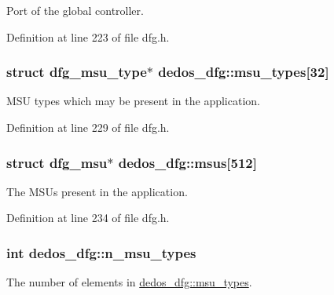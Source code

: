 Port of the global controller. 



Definition at line 223 of file dfg.\-h.

\hypertarget{structdedos__dfg_a6413c359339136a9acaf77df3b897305}{
\subsubsection[{msu\-\_\-types}]{\setlength{\rightskip}{0pt plus 5cm}struct {\bf dfg\-\_\-msu\-\_\-type}$\ast$ dedos\-\_\-dfg\-::msu\-\_\-types\mbox{[}32\mbox{]}}}\label{structdedos__dfg_a6413c359339136a9acaf77df3b897305}


M\-S\-U types which may be present in the application. 



Definition at line 229 of file dfg.\-h.

\hypertarget{structdedos__dfg_a5177dba1dea7f8f2fb383c5839c5f5f7}{
\subsubsection[{msus}]{\setlength{\rightskip}{0pt plus 5cm}struct {\bf dfg\-\_\-msu}$\ast$ dedos\-\_\-dfg\-::msus\mbox{[}512\mbox{]}}}\label{structdedos__dfg_a5177dba1dea7f8f2fb383c5839c5f5f7}


The M\-S\-Us present in the application. 



Definition at line 234 of file dfg.\-h.

\hypertarget{structdedos__dfg_ac78a52257324eec0ccf425530c84e91a}{
\subsubsection[{n\-\_\-msu\-\_\-types}]{\setlength{\rightskip}{0pt plus 5cm}int dedos\-\_\-dfg\-::n\-\_\-msu\-\_\-types}}\label{structdedos__dfg_ac78a52257324eec0ccf425530c84e91a}


The number of elements in \hyperlink{structdedos__dfg_a6413c359339136a9acaf77df3b897305}{dedos\-\_\-dfg\-::msu\-\_\-types}. 



